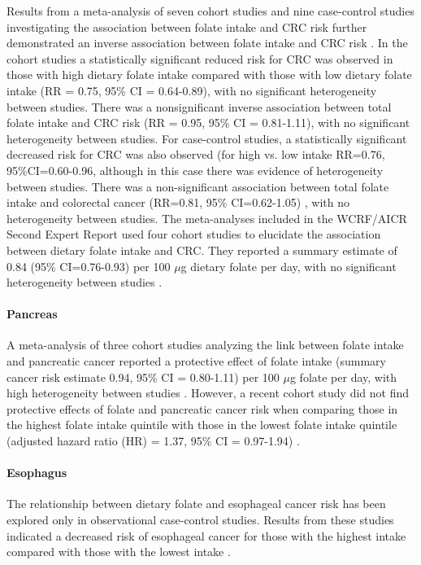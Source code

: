 \noindent Results from a meta-analysis of seven cohort studies and nine case-control studies investigating the association between folate intake and CRC risk further demonstrated an inverse association between folate intake and CRC risk \cite{c233}. In the cohort studies a statistically significant reduced risk for CRC was observed in those with high dietary folate intake compared with those with low dietary folate intake (RR = 0.75, 95\% CI = 0.64-0.89), with no significant heterogeneity between studies. There was a nonsignificant inverse association between total folate intake and CRC risk (RR = 0.95, 95\% CI = 0.81-1.11), with no significant heterogeneity between studies. For case-control studies, a statistically significant decreased risk for CRC was also observed (for high vs. low intake RR=0.76, 95\%CI=0.60-0.96, although in this case there was evidence of heterogeneity between studies. There was a non-significant association between total folate intake and colorectal cancer (RR=0.81, 95\% CI=0.62-1.05)
, with no heterogeneity between studies. The meta-analyses included in the WCRF/AICR Second Expert Report used four cohort studies to elucidate the association between dietary folate intake and CRC. They reported a summary estimate of 0.84 (95\% CI=0.76-0.93) per 100 $\mu$g dietary folate per day, with no significant heterogeneity between studies \cite{c214}. 
 
\paragraph{Pancreas} %
A meta-analysis of three cohort studies analyzing the link between folate intake and pancreatic cancer reported a protective effect of folate intake (summary cancer risk estimate 0.94, 95\% CI = 0.80-1.11) per 100 $\mu$g folate per day, with high heterogeneity between studies \cite{c214}. However, a recent cohort study did not find protective effects of folate and pancreatic cancer risk when comparing those in the highest folate intake quintile with those in the lowest folate intake quintile (adjusted hazard ratio (HR) = 1.37, 95\% CI = 0.97-1.94) \cite{c234}. 
 
\paragraph{Esophagus} %
The relationship between dietary folate and esophageal cancer risk has been explored only in observational case-control studies. Results from these studies indicated a decreased risk of esophageal cancer for those with the highest intake compared with those with the lowest intake \cite{c214}. 
 
